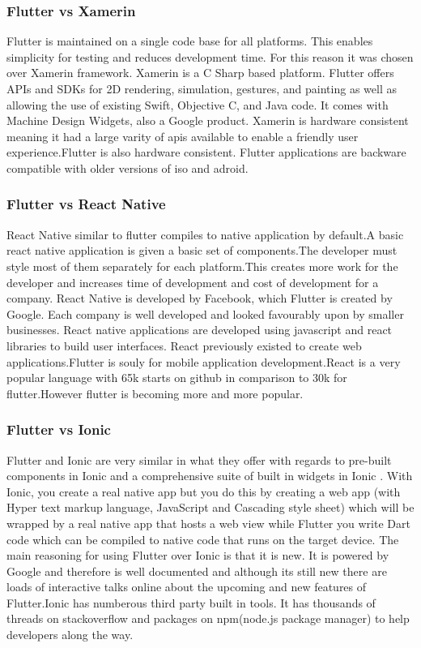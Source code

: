 \subsubsection{Flutter vs Xamerin}
Flutter is maintained on a single code base for all platforms. This enables simplicity for testing and reduces development time. For this reason it was chosen over Xamerin framework. Xamerin is a C Sharp based platform. Flutter offers APIs and SDKs for 2D rendering, simulation, gestures, and painting as well as allowing the use of existing Swift, Objective C, and Java code. It comes with Machine Design Widgets, also a Google product. \cite{flutterVsXamarin}Xamerin is hardware consistent meaning it had a large varity of apis available to enable a friendly user experience.Flutter is also hardware consistent. Flutter applications are backware compatible with older versions of iso and adroid.\cite{flutterVsReactVsXamarin}

\subsubsection{Flutter vs React Native}
React Native similar to flutter compiles to native application by default.A basic react native application is given a basic set of components.The developer must style most of them separately for each platform.This creates more work for the developer and increases time of development and cost of development for a company. React Native is developed by Facebook, which Flutter is created by Google. Each company is well developed and looked favourably upon by smaller businesses. React native applications are developed using javascript and react libraries to build user interfaces. React previously existed to create web applications.Flutter is souly for mobile application development.React is a very popular language with 65k starts on github in comparison to 30k for flutter.However flutter is becoming more and more popular. \cite{FlutterVS_2018} \cite{ReactVsFlutterVsIonic}

\subsubsection{Flutter vs Ionic}
Flutter and Ionic are very similar in what they offer with regards to pre-built components in Ionic and a comprehensive suite of built in widgets in Ionic \cite{ReactVsFlutterVsIonic}. With Ionic, you create a real native app but you do this by creating a web app (with Hyper text markup language, JavaScript and Cascading style sheet) which will be wrapped by a real native app that hosts a web view while Flutter you write Dart code which can be compiled to native code that runs on the target device. The main reasoning for using Flutter over Ionic is that it is new. It is powered by Google and therefore is well documented and although its still new there are loads of interactive talks online about the upcoming and new features of Flutter.Ionic has numberous third party built in tools. It has thousands of threads on stackoverflow and packages on npm(node.js package manager) to help developers along the way.\cite{FlutterVS_2018}

